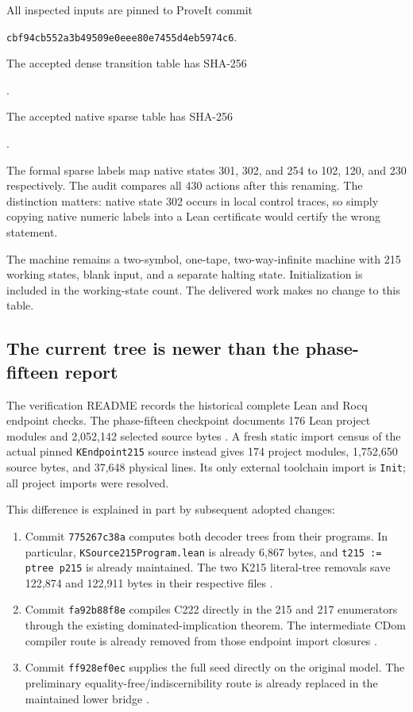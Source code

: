 \documentclass[11pt]{article}
\theoremstyle{definition}\newtheorem{definition}[theorem]{Definition}
\theoremstyle{remark}\newtheorem{remark}[theorem]{Remark}
\newcommand{\code}[1]{\nolinkurl{#1}}
\begin{document}
All inspected inputs are pinned to ProveIt commit
\begin{center}\small\code{cbf94cb552a3b49509e0eee80e7455d4eb5974c6}.\end{center}
The accepted dense transition table has SHA-256
\begin{center}\small{}.\end{center}
The accepted native sparse table has SHA-256
\begin{center}\small{}.\end{center}
The formal sparse labels map native states 301, 302, and 254 to 102, 120, and 230 respectively. The audit compares all 430 actions after this renaming. The distinction matters: native state 302 occurs in local control traces, so simply copying native numeric labels into a Lean certificate would certify the wrong statement.

The machine remains a two-symbol, one-tape, two-way-infinite machine with 215 working states, blank input, and a separate halting state. Initialization is included in the working-state count. The delivered work makes no change to this table.

\subsection{The current tree is newer than the phase-fifteen report}

The verification README records the historical complete Lean and Rocq endpoint checks. The phase-fifteen checkpoint documents 176 Lean project modules and 2,052,142 selected source bytes \cite{verification,phase15}. A fresh static import census of the actual pinned \code{KEndpoint215} source instead gives 174 project modules, 1,752,650 source bytes, and 37,648 physical lines. Its only external toolchain import is \code{Init}; all project imports were resolved.

This difference is explained in part by subsequent adopted changes:
\begin{enumerate}
\item Commit \code{775267c38a} computes both decoder trees from their programs. In particular, \code{KSource215Program.lean} is already 6,867 bytes, and \code{t215 := ptree p215} is already maintained. The two K215 literal-tree removals save 122,874 and 122,911 bytes in their respective files \cite{computed}.
\item Commit \code{fa92b88f8e} compiles C222 directly in the 215 and 217 enumerators through the existing dominated-implication theorem. The intermediate CDom compiler route is already removed from those endpoint import closures \cite{fusion}.
\item Commit \code{ff928ef0ec} supplies the full seed directly on the original model. The preliminary equality-free/indiscernibility route is already replaced in the maintained lower bridge \cite{seed}.
\end{enumerate}
\end{document}
